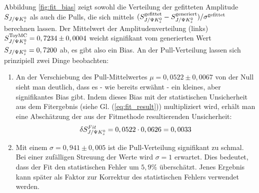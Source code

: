 Abbildung \ref{fig:fit_bias} zeigt sowohl die Verteilung der gefitteten Amplitude $S_{J/\Psi K_s^0}$ als auch die Pulls, die sich mittels $(S_{J/\Psi K_s^0}^{\text{gefittet}} - S_{J/\Psi K_s^0}^{\text{generiert}})/\sigma^{\text{gefittet}}$ berechnen lassen. Der Mittelwert der Amplitudenverteilung (links) $S_{J/\Psi K_s^0}^{\text{ToyMC}} = 0,7234 \pm 0,0004$ weicht signifikant vom generierten Wert $S_{J/\Psi K_s^0} = 0,7200$ ab, es gibt also ein Bias. An der Pull-Verteilung lassen sich prinzipiell zwei Dinge beobachten:
\begin{enumerate}
    \item An der Verschiebung des Pull-Mittelwertes $\mu = 0,0522 \pm 0,0067$ von der Null sieht man deutlich, dass es - wie bereits erwähnt - ein kleines, aber signifikantes Bias gibt. Indem dieses Bias mit der statistischen Unsicherheit aus dem Fitergebnis (siehe Gl. (\ref{eq:fit_result})) multipliziert wird, erhält man eine Abschätzung der aus der Fitmethode resultierenden Unsicherheit:
        \begin{align}
        \delta S_{J/\Psi K_s^0}^{Fit} = 0,0522 \cdot 0,0626 = 0,0033
        \end{align}

    \item Mit einem $\sigma = 0,941 \pm 0,005$ ist die Pull-Verteilung signifikant zu schmal. Bei einer zufälligen Streuung der Werte wird $\sigma=1$ erwartet. Dies bedeutet, dass der Fit den statistischen Fehler um $5,9\%$ überschätzt. Jenes Ergebnis kann später als Faktor zur Korrektur des statistischen Fehlers verwendet werden. 
\end{enumerate}

